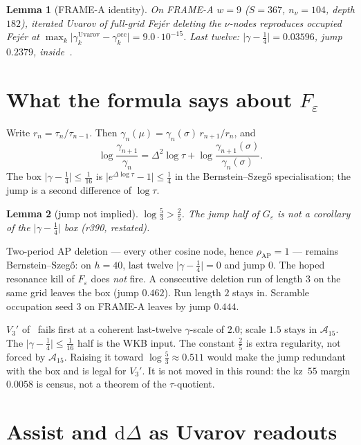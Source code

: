 \documentclass[11pt]{article}
\newtheorem{lemma}{Lemma}
\theoremstyle{remark}
\newcommand{\eps}{\varepsilon}
\begin{document}
\begin{lemma}[FRAME-A identity]\label{lem:w9}
On FRAME-A $w=9$ ($S=367$, $n_\nu=104$, depth $182$), iterated
Uvarov of full-grid Fej\'er deleting the $\nu$-nodes reproduces
occupied Fej\'er at $\max_k\lvert\gamma_k^{\mathrm{Uvarov}}-\gamma_k^{\mathrm{occ}}\rvert=9.0\cdot10^{-15}$.
Last twelve: $\lvert\gamma-\tfrac14\rvert=0.03596$, jump $0.2379$,
inside~\cite{v3p}.
\end{lemma}

\section{What the formula says about \texorpdfstring{$F_\eps$}{Feps}}\label{sec:feps}

Write $r_n=\tau_n/\tau_{n-1}$.  Then
$\gamma_n(\mu)=\gamma_n(\sigma)\,r_{n+1}/r_n$, and
\[
\log\frac{\gamma_{n+1}}{\gamma_n}
=
\Delta^2\log\tau
+\log\frac{\gamma_{n+1}(\sigma)}{\gamma_n(\sigma)}.
\]
The box $\lvert\gamma-\tfrac14\rvert\le\tfrac1{16}$ is
$\lvert e^{\Delta\log\tau}-1\rvert\le\tfrac14$ in the
Bernstein--Szeg\H{o} specialisation;
the jump is a second difference of $\log\tau$.

\begin{lemma}[jump not implied]\label{lem:jump}
$\log\tfrac53>\tfrac25$.  The jump half of $G_\varepsilon$ is not
a corollary of the $\lvert\gamma-\tfrac14\rvert$ box
(r390, restated).
\end{lemma}

Two-period AP deletion --- every other cosine node, hence
$\rho_{\mathrm{AP}}=1$ --- remains Bernstein--Szeg\H{o}:
on $h=40$, last twelve $\lvert\gamma-\tfrac14\rvert=0$ and jump $0$.
The hoped resonance kill of $F_\eps$ does \emph{not} fire.
A consecutive deletion run of length $3$ on the same grid
leaves the box (jump $0.462$).
Run length $2$ stays in.
Scramble occupation seed $3$ on FRAME-A leaves by jump $0.444$.

$V_3'$ of~\cite{v3p} fails first at a coherent last-twelve
$\gamma$-scale of $2.0$; scale $1.5$ stays in $\mathcal{A}_{15}$.
The $\lvert\gamma-\tfrac14\rvert\le\tfrac1{16}$ half is the WKB
input.
The constant $\tfrac25$ is extra regularity, not forced by
$\mathcal{A}_{15}$.
Raising it toward $\log\tfrac53\approx 0.511$ would make the jump
redundant with the box and is legal for $V_3'$.
It is not moved in this round: the kz~$55$ margin $0.0058$ is
census, not a theorem of the $\tau$-quotient.

\section{Assist and \texorpdfstring{$\mathrm{d}\Delta$}{dDelta} as Uvarov readouts}\label{sec:assist}
\end{document}
